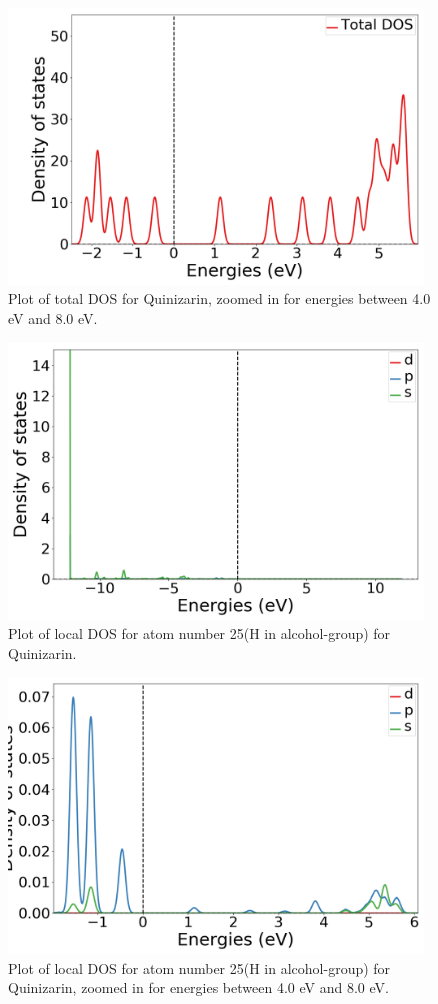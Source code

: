 \documentclass{article}
\begin{document}
  \begin{figure}[H]
      \centering
      \includegraphics[width = 11cm]{../fig/basic_TDOS_2.png}
      \caption{Plot of total DOS for Quinizarin, zoomed in for energies between 4.0 eV and 8.0 eV. }
      \label{fig:basic_TDOS_2}
  \end{figure}

  \begin{figure}[H]
      \centering
      \includegraphics[width = 11cm]{../fig/basic_LDOS25_1.png}
      \caption{Plot of local DOS for atom number 25(H in alcohol-group) for Quinizarin.}
      \label{fig:basic_LDOS25_1}
  \end{figure}

  \begin{figure}[H]
      \centering
      \includegraphics[width = 11cm]{../fig/basic_LDOS25_2.png}
      \caption{Plot of local DOS for atom number 25(H in alcohol-group) for Quinizarin, zoomed in for energies between 4.0 eV and 8.0 eV. }
      \label{fig:basic_LDOS25_2}
  \end{figure}
\end{document}
